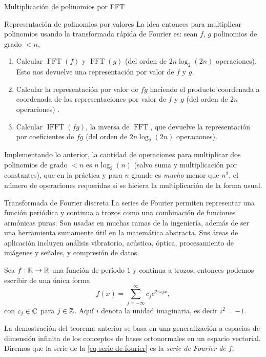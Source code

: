 \begin{chapter}{Multiplicación de polinomios por FFT}
\begin{section}{Representación de polinomios por valores}
        La idea entonces para multiplicar polinomios usando la transformada rápida de Fourier es:  sean $f$, $g$ polinomios de grado $<n$,
        \begin{enumerate}
            \item Calcular $\operatorname{FFT}(f)$ y $\operatorname{FFT}(g)$ (del orden de $2n\operatorname{log}_2(2n)$ operaciones). Esto nos devuelve una representación por valor de $f$ y $g$.
            \item Calcular  la representación por valor de $fg$ haciendo el producto coordenada a coordenada de las representaciones por valor de $f$ y $g$ (del orden de $2n$ operaciones)  .
            \item Calcular $\operatorname{IFFT}(fg)$, la inversa de $\operatorname{FFT}$, que devuelve la representación por coeficientes de $fg$ (del orden de $2n\operatorname{log}_2(2n)$ operaciones).
        \end{enumerate}

        Implementando lo anterior, la cantidad de operaciones para multiplicar dos polinomios de grado $<n$  es $n \log_2(n)$ (salvo suma y multiplicación por constantes), que en la práctica y para $n$ grande es \textit{mucho} menor que $n^2$, el número de operaciones requeridas si se hiciera la multiplicación de la forma usual. 

    \end{section}

    \begin{section}{Transformada de Fourier discreta} La series de Fourier permiten representar una función periódica y continua a trozos como una combinación de funciones armónicas puras. Son usadas en muchas ramas de la ingeniería, además de ser una herramienta sumamente útil en la matemática abstracta. Sus áreas de aplicación incluyen análisis vibratorio, acústica, óptica, procesamiento de imágenes y señales, y compresión de datos. 

        \begin{teorema}\label{th-series-de-fourier}
            Sea $f: \mathbb R \to \mathbb R$ una función de período $1$ y continua a trozos, entonces podemos escribir de una única forma
            \begin{equation}\label{eq-serie-de-fourier}
                f(x) = \sum_{ j= -\infty}^\infty c_j e^{2\pi ijx},
            \end{equation}
            con $c_j \in \mathbb C$ para $j \in \mathbb Z$. Aquí $i$  denota la unidad imaginaria, es decir $i^2 = -1$.
        \end{teorema}
        La demostración del teorema anterior se basa en una generalización a espacios de dimensión infinita de los conceptos de bases ortonormales en un espacio vectorial. Diremos que la serie de la \eqref{eq-serie-de-fourier} es la \textit{serie de Fourier de $f$}. 


\end{section}
\end{chapter}

